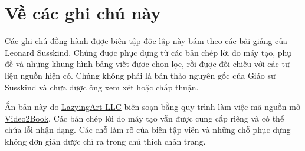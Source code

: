 \documentclass[11pt,oneside]{book}
\begin{document}
\frontmatter
\hypersetup{pageanchor=false}

\hypersetup{pageanchor=true}

\clearpage
\chapter*{Về các ghi chú này}
Các ghi chú đồng hành được biên tập độc lập này bám theo các bài giảng của Leonard Susskind. Chúng được phục dựng từ các bản chép lời do máy tạo, phụ đề và những khung hình bảng viết được chọn lọc, rồi được đối chiếu với các tư liệu nguồn hiện có. Chúng không phải là bản thảo nguyên gốc của Giáo sư Susskind và chưa được ông xem xét hoặc chấp thuận.

Ấn bản này do \href{https://lazying.art}{LazyingArt LLC} biên soạn bằng quy trình làm việc mã nguồn mở \href{https://github.com/lachlanchen/Video2Book}{Video2Book}. Các bản chép lời do máy tạo vẫn được cung cấp riêng và có thể chứa lỗi nhận dạng. Các chỗ làm rõ của biên tập viên và những chỗ phục dựng không đơn giản được chỉ ra trong chú thích chân trang.
\clearpage
\tableofcontents
\mainmatter










\end{document}
